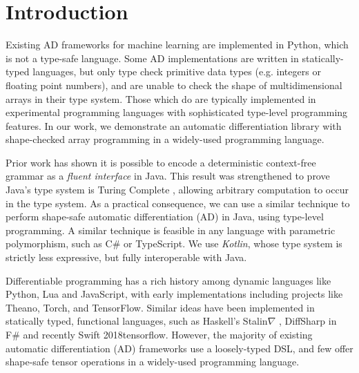 \documentclass{article}
\begin{document}


\printAffiliationsAndNotice{}  %

\section{Introduction}
\label{submission}

Existing AD frameworks for machine learning are implemented in Python, which is not a type-safe language. Some AD implementations are written in statically-typed languages, but only type check primitive data types (e.g. integers or floating point numbers), and are unable to check the shape of multidimensional arrays in their type system. Those which do are typically implemented in experimental programming languages with sophisticated type-level programming features. In our work, we demonstrate an automatic differentiation library with shape-checked array programming in a widely-used programming language.

Prior work has shown it is possible to encode a deterministic context-free grammar as a \textit{fluent interface} \cite{gil2016formal} in Java. This result was strengthened to prove Java's type system is Turing Complete \cite{grigore2017java}, allowing arbitrary computation to occur in the type system. As a practical consequence, we can use a similar technique to perform shape-safe automatic differentiation (AD) in Java, using type-level programming. A similar technique is feasible in any language with parametric polymorphism, such as C\# or TypeScript. We use \textit{Kotlin}, whose type system is strictly less expressive, but fully interoperable with Java.

Differentiable programming has a rich history among dynamic languages like Python, Lua and JavaScript, with early implementations including projects like Theano, Torch, and TensorFlow. Similar ideas have been implemented in statically typed, functional languages, such as Haskell's Stalin$\nabla$ \cite{pearlmutter2008using}, DiffSharp in F\# \cite{baydin2015diffsharp} and recently Swift \citelattner2018tensorflow. However, the majority of existing automatic differentiation (AD) frameworks use a loosely-typed DSL, and few offer shape-safe tensor operations in a widely-used programming language.
\end{document}
